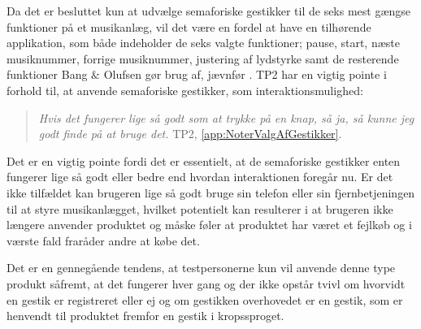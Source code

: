 Da det er besluttet kun at udvælge semaforiske gestikker til de seks mest gængse funktioner på et musikanlæg, vil det være en fordel at have en tilhørende applikation, som både indeholder de seks valgte funktioner; pause, start, næste musiknummer, forrige musiknummer, justering af lydstyrke samt de resterende funktioner Bang $\&$ Olufsen gør brug af, jævnfør .\blankline
% 
TP2 har en vigtig pointe i forhold til, at anvende semaforiske gestikker, som interaktionsmulighed: 
%
\begin{quotation}
\noindent
\textit{Hvis det fungerer lige så godt som at trykke på en knap, så ja, så kunne jeg godt finde på at bruge det.} TP2, \autoref{app:NoterValgAfGestikker}. 
\end{quotation}
%
Det er en vigtig pointe fordi det er essentielt, at de semaforiske gestikker enten fungerer lige så godt eller bedre end hvordan interaktionen foregår nu. Er det ikke tilfældet kan brugeren lige så godt bruge sin telefon eller sin fjernbetjeningen til at styre musikanlægget, hvilket potentielt kan resulterer i at brugeren ikke længere anvender produktet og måske føler at produktet har været et fejlkøb og i værste fald fraråder andre at købe det. 

Det er en gennegående tendens, at testpersonerne kun vil anvende denne type produkt såfremt, at det fungerer hver gang og der ikke opstår tvivl om hvorvidt en gestik er registreret eller ej og om gestikken overhovedet er en gestik, som er henvendt til produktet fremfor en gestik i kropssproget.
